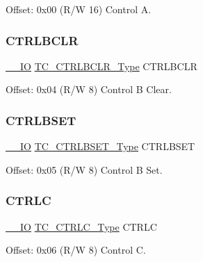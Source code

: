 Offset\+: 0x00 (R/W 16) Control A. 

\mbox{\label{struct_tc_count32_a5d266ecd4b84c85e2136fcdfcdd1e57f}} 
\subsubsection{\texorpdfstring{CTRLBCLR}{CTRLBCLR}}
{\footnotesize\ttfamily \mbox{\hyperlink{core__cm0plus_8h_aec43007d9998a0a0e01faede4133d6be}{\+\_\+\+\_\+\+IO}} \mbox{\hyperlink{union_t_c___c_t_r_l_b_c_l_r___type}{T\+C\+\_\+\+C\+T\+R\+L\+B\+C\+L\+R\+\_\+\+Type}} C\+T\+R\+L\+B\+C\+LR}



Offset\+: 0x04 (R/W 8) Control B Clear. 

\mbox{\label{struct_tc_count32_aad77cd2b986ac4f6e8112f1d8ef850a5}} 
\subsubsection{\texorpdfstring{CTRLBSET}{CTRLBSET}}
{\footnotesize\ttfamily \mbox{\hyperlink{core__cm0plus_8h_aec43007d9998a0a0e01faede4133d6be}{\+\_\+\+\_\+\+IO}} \mbox{\hyperlink{union_t_c___c_t_r_l_b_s_e_t___type}{T\+C\+\_\+\+C\+T\+R\+L\+B\+S\+E\+T\+\_\+\+Type}} C\+T\+R\+L\+B\+S\+ET}



Offset\+: 0x05 (R/W 8) Control B Set. 

\mbox{\label{struct_tc_count32_ac5a6e57255482215b0d11685290ea67a}} 
\subsubsection{\texorpdfstring{CTRLC}{CTRLC}}
{\footnotesize\ttfamily \mbox{\hyperlink{core__cm0plus_8h_aec43007d9998a0a0e01faede4133d6be}{\+\_\+\+\_\+\+IO}} \mbox{\hyperlink{union_t_c___c_t_r_l_c___type}{T\+C\+\_\+\+C\+T\+R\+L\+C\+\_\+\+Type}} C\+T\+R\+LC}



Offset\+: 0x06 (R/W 8) Control C. 

\mbox{\label{struct_tc_count32_ad7d3dc3cf041a0c2b409cdc6a0511ef8}} 
